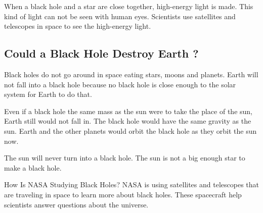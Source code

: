 \documentclass[15pt]{article}
\begin{document}
			When a black hole and a star are close together, high-energy light is made. This kind of light can not be seen with human eyes. Scientists use satellites and telescopes in space to see the high-energy light.
		
		\subsection{Could a Black Hole Destroy Earth ?}
			Black holes do not go around in space eating stars, moons and planets. Earth will not fall into a black hole because no black hole is close enough to the solar system for Earth to do that.
			
			Even if a black hole the same mass as the sun were to take the place of the sun, Earth still would not fall in. The black hole would have the same gravity as the sun. Earth and the other planets would orbit the black hole as they orbit the sun now.
			
			The sun will never turn into a black hole. The sun is not a big enough star to make a black hole.
			
			How Is NASA Studying Black Holes?
			NASA is using satellites and telescopes that are traveling in space to learn more about black holes. These spacecraft help scientists answer questions about the universe.

	\pagebreak
	
	
	
\end{document}

